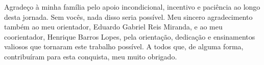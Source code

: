 \documentclass[
        oneside,      %
        english,			
        brazil			 
        ]{configcefetmglpd}
\begin{document}


\printacapa

\printafolhaderosto

\printacatalog  





 
\begin{agradecimentos}
Agradeço à minha família pelo apoio incondicional, incentivo e paciência ao longo desta jornada. Sem vocês, nada disso seria possível.
Meu sincero agradecimento também ao meu orientador, Eduardo Gabriel Reis Miranda, e ao meu coorientador, Henrique Barros Lopes, pela orientação, dedicação e ensinamentos valiosos que tornaram este trabalho possível.
A todos que, de alguma forma, contribuíram para esta conquista, meu muito obrigado.

\end{agradecimentos}


\end{document}
